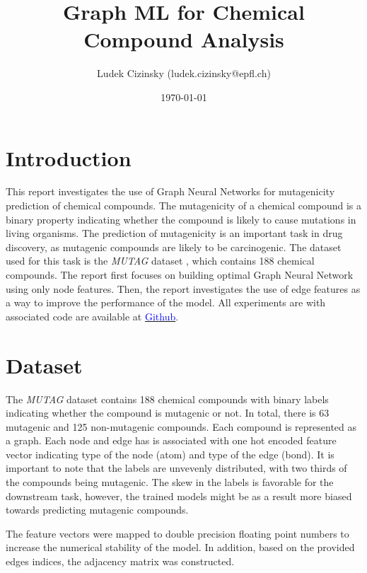 \documentclass[10pt,twocolumn]{article}
\title{\vspace{-2cm}Graph ML for Chemical Compound Analysis}
\author{Ludek Cizinsky (ludek.cizinsky@epfl.ch)}
\date{\today}
\begin{document}
\maketitle

\section{Introduction}
This report investigates the use of Graph Neural Networks
for mutagenicity prediction of chemical compounds. 
The mutagenicity of a chemical compound is a binary property
indicating whether the compound is likely to cause mutations
in living organisms. The prediction of mutagenicity is an
important task in drug discovery, as mutagenic compounds
are likely to be carcinogenic. The dataset used for this task is the 
\textit{MUTAG} dataset \cite{mutag}, which contains 188 chemical compounds.
The report first focuses on building optimal Graph Neural Network using
only node features. Then, the report investigates the use of edge features
as a way to improve the performance of the model. All experiments are
with associated code are available at \href{https://github.com/ludekcizinsky/epfl-cs502/tree/main/coursework/homeworks/hw2}{\textcolor{blue}{Github}}. 

\section{Dataset}\label{sec:dataset}
The \textit{MUTAG} dataset \cite{mutag} contains 188 chemical compounds with
binary labels indicating whether the compound is mutagenic or not. In total,
there is 63 mutagenic and 125 non-mutagenic compounds. Each compound is represented
as a graph. Each node and edge has is associated with one hot encoded feature vector
indicating type of the node (atom) and type of the edge (bond). It is important to note
that the labels are unvevenly distributed, with two thirds of the compounds being mutagenic.
The skew in the labels is favorable for the downstream task, however, the trained
models might be as a result more biased towards predicting mutagenic compounds.


The feature vectors were mapped to double precision floating point numbers to
increase the numerical stability of the model. In addition, based on the provided
edges indices, the adjacency matrix was constructed.


\end{document}
